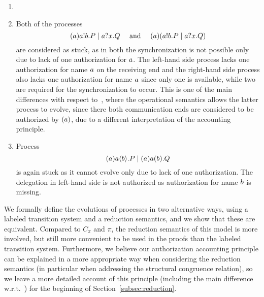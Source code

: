 \begin{example}
\label{ex:op_semantics2}
\begin{enumerate}\item[]{}
\item
Both of the processes
\[     
  {(a)a!b.P \;|\; a?x.Q \quad \text{ and } \quad (a)(a!b.P \;|\; a?x.Q)}
\] 
are considered as stuck, as in both the synchronization is not possible only due to lack of one authorization for $a$.
The left-hand side process lacks one authorization for name $a$ on the receiving end and the right-hand side process also lacks one authorization for name $a$ since only one is available, while two are required for the synchronization to occur.
This is one of the main differences with respect to~\cite{DBLP:journals/corr/GhilezanJPPV16,clar:eke}, where the operational semantics allows the latter process to evolve, since there both communication ends are considered to be %
authorized by $(a)$, due to a different interpretation of the accounting principle.
\item
Process
 \[
    (a) a\langle b\rangle.P \;|\;  (a)a(b).Q
\]
is again stuck as it cannot evolve only due to lack of one authorization. The 
delegation in left-hand side is not authorized as authorization for name $b$ is missing. 
\end{enumerate}
\end{example}
%
%





We formally define the evolutions of processes in two alternative ways, using a labeled transition system and a reduction semantics, and we show that these are equivalent. 
Compared to $C_\pi$ and $\pi$, the reduction semantics of this model is more involved, but still more convenient to be used in the proofs than the labeled transition system. Furthermore, we believe our authorization accounting principle can be explained in a more appropriate way when considering the reduction semantics (in particular when addressing the structural congruence relation), so we leave a more detailed account of this principle (including the main difference w.r.t.~\cite{clar:eke}) for the beginning of Section~\ref{subsec:reduction}. 






